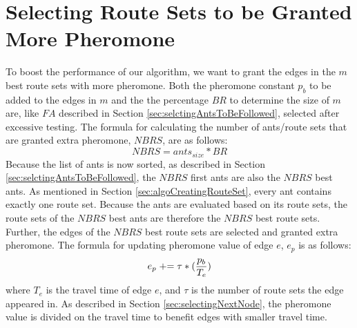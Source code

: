 \section{Selecting Route Sets to be Granted More Pheromone}
To boost the performance of our algorithm, we want to grant the edges in the $m$ best route sets with more pheromone. Both the pheromone constant $p_b$ to be added to the edges in $m$ and the the percentage $BR$ to determine the size of $m$ are, like $FA$ described in Section \vref{sec:selctingAntsToBeFollowed}, selected after excessive testing. The formula for calculating the number of ants/route sets that are granted extra pheromone, $NBRS$, are as follows:
\newline
$$NBRS = ants_{size} * BR$$
\newline
Because the list of ants is now sorted, as described in Section \vref{sec:selctingAntsToBeFollowed}, the $NBRS$ first ants are also the $NBRS$ best ants. As mentioned in Section \vref{sec:algoCreatingRouteSet}, every ant contains exactly one route set. Because the ants are evaluated based on its route sets, the route sets of the $NBRS$ best ants are therefore the $NBRS$ best route sets. Further, the edges of the $NBRS$ best route sets are selected and granted extra pheromone. The formula for updating pheromone value of edge $e$, $e_p$ is as follows:
\newline
$$e_p \mathrel{+}= \tau*(\frac{p_b}{T_e})$$ 
\newline
where $T_e$ is the travel time of edge $e$, and $\tau$ is the number of route sets the edge appeared in. As described in Section \vref{sec:selectingNextNode}, the pheromone value is divided on the travel time to benefit edges with smaller travel time. 